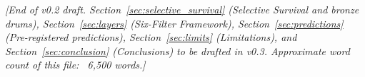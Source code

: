 \documentclass[12pt,a4paper]{article}
\begin{document}
\vspace{1em}
\noindent\textit{[End of v0.2 draft. Section~\ref{sec:selective_survival} (Selective Survival and bronze drums), Section~\ref{sec:layers} (Six-Filter Framework), Section~\ref{sec:predictions} (Pre-registered predictions), Section~\ref{sec:limits} (Limitations), and Section~\ref{sec:conclusion} (Conclusions) to be drafted in v0.3. Approximate word count of this file: ~6{,}500 words.]}



\end{document}
